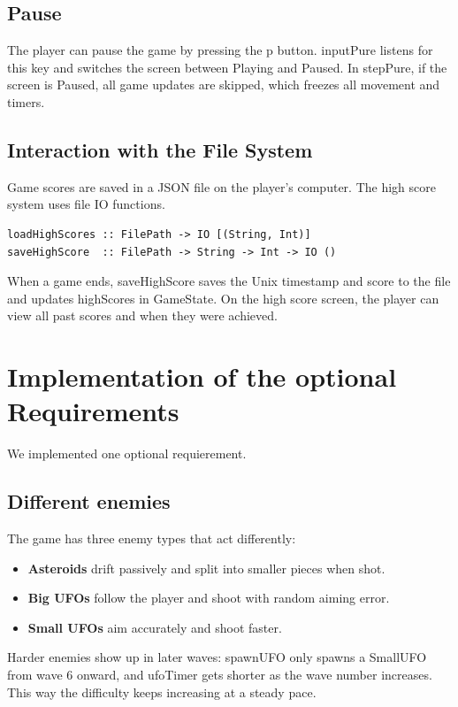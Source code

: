 \documentclass{article}
\begin{document}
\subsection{Pause}
The player can pause the game by pressing the p button. inputPure listens for this key and switches the screen between Playing and Paused. In stepPure, if the screen is Paused, all game updates are skipped, which freezes all movement and timers.

\subsection{Interaction with the File System}
Game scores are saved in a JSON file on the player's computer. The high score system uses file IO functions.
\begin{verbatim}
loadHighScores :: FilePath -> IO [(String, Int)]
saveHighScore  :: FilePath -> String -> Int -> IO ()
\end{verbatim}
When a game ends, saveHighScore saves the Unix timestamp and score to the file and updates highScores in GameState. On the high score screen, the player can view all past scores and when they were achieved.

\section{Implementation of the optional Requirements}
We implemented one optional requierement.

\subsection{Different enemies}
The game has three enemy types that act differently:
\begin{itemize}
  \item \textbf{Asteroids} drift passively and split into smaller pieces when shot.
  \item \textbf{Big UFOs} follow the player and shoot with random aiming error.
  \item \textbf{Small UFOs} aim accurately and shoot faster.
\end{itemize}
Harder enemies show up in later waves: spawnUFO only spawns a SmallUFO from wave 6 onward, and ufoTimer gets shorter as the wave number increases. This way the difficulty keeps increasing at a steady pace.
\end{document}
